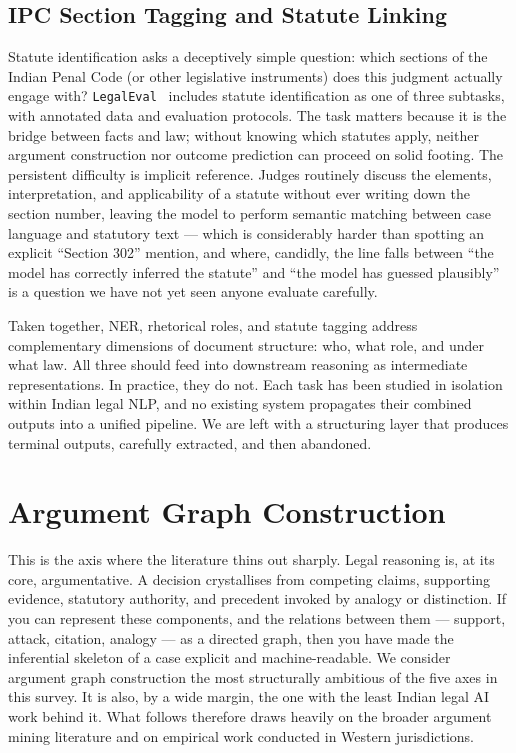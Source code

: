 \subsection{IPC Section Tagging and Statute Linking}

Statute identification asks a deceptively simple question: which sections of the Indian Penal Code (or other legislative instruments) does this judgment actually engage with? \texttt{LegalEval}~\cite{modi-etal-2023-semeval} includes statute identification as one of three subtasks, with annotated data and evaluation protocols. The task matters because it is the bridge between facts and law; without knowing which statutes apply, neither argument construction nor outcome prediction can proceed on solid footing. The persistent difficulty is implicit reference. Judges routinely discuss the elements, interpretation, and applicability of a statute without ever writing down the section number, leaving the model to perform semantic matching between case language and statutory text — which is considerably harder than spotting an explicit ``Section 302'' mention, and where, candidly, the line falls between ``the model has correctly inferred the statute'' and ``the model has guessed plausibly'' is a question we have not yet seen anyone evaluate carefully.

Taken together, NER, rhetorical roles, and statute tagging address complementary dimensions of document structure: who, what role, and under what law. All three should feed into downstream reasoning as intermediate representations. In practice, they do not. Each task has been studied in isolation within Indian legal NLP, and no existing system propagates their combined outputs into a unified pipeline. We are left with a structuring layer that produces terminal outputs, carefully extracted, and then abandoned.

\section{Argument Graph Construction}

This is the axis where the literature thins out sharply. Legal reasoning is, at its core, argumentative. A decision crystallises from competing claims, supporting evidence, statutory authority, and precedent invoked by analogy or distinction. If you can represent these components, and the relations between them — support, attack, citation, analogy — as a directed graph, then you have made the inferential skeleton of a case explicit and machine-readable. We consider argument graph construction the most structurally ambitious of the five axes in this survey. It is also, by a wide margin, the one with the least Indian legal AI work behind it. What follows therefore draws heavily on the broader argument mining literature and on empirical work conducted in Western jurisdictions.

